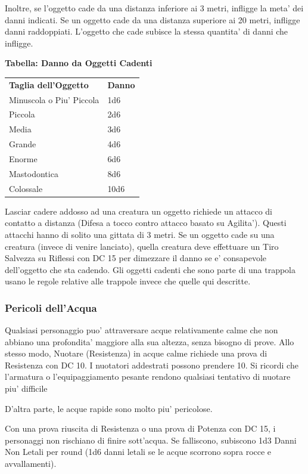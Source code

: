 \documentclass[a4paper,11pt,twoside,openany]{book}
\begin{document}
{Inoltre, se l'oggetto cade da una distanza inferiore ai 3 metri, infligge la meta' dei danni indicati. Se un oggetto cade da una distanza superiore ai 20 metri, infligge danni raddoppiati. L'oggetto che cade subisce la stessa quantita' di danni che infligge.

\bigskip

\textbf{Tabella: Danno da Oggetti Cadenti}

\begin{tabular}{ll}
\toprule
\textbf{Taglia dell'Oggetto} & \textbf{Danno}\tabularnewline
Minuscola o Piu' Piccola & 1d6\tabularnewline
Piccola & 2d6\tabularnewline
Media & 3d6\tabularnewline
Grande & 4d6\tabularnewline
Enorme & 6d6\tabularnewline
Mastodontica & 8d6\tabularnewline
Colossale & 10d6\tabularnewline

\end{tabular}

\bigskip

Lasciar cadere addosso ad una creatura un oggetto richiede un attacco di contatto a distanza (Difesa a tocco contro attacco basato su Agilita'). Questi attacchi hanno di solito una gittata di 3 metri. Se un oggetto cade su una creatura (invece di venire lanciato), quella creatura deve effettuare un Tiro Salvezza su Riflessi con DC 15 per dimezzare il danno se e' consapevole dell'oggetto che sta cadendo. Gli oggetti cadenti che sono parte di una trappola usano le regole relative alle trappole invece che quelle qui descritte.

\subsubsection{Pericoli dell'Acqua}

\label{pericoli-dellacqua}

Qualsiasi personaggio puo' attraversare acque relativamente calme che non abbiano una profondita' maggiore alla sua altezza, senza bisogno di prove. Allo stesso modo, Nuotare (Resistenza) in acque calme richiede una prova di Resistenza con DC 10. I nuotatori addestrati possono prendere 10. Si ricordi che l'armatura o l'equipaggiamento pesante rendono qualsiasi tentativo di nuotare piu' difficile

D'altra parte, le acque rapide sono molto piu' pericolose.

Con una prova riuscita di Resistenza o una prova di Potenza con DC 15, i personaggi non rischiano di finire sott'acqua. Se falliscono, subiscono 1d3 Danni Non Letali per round (1d6 danni letali se le acque scorrono sopra rocce e avvallamenti).

}
\end{document}
